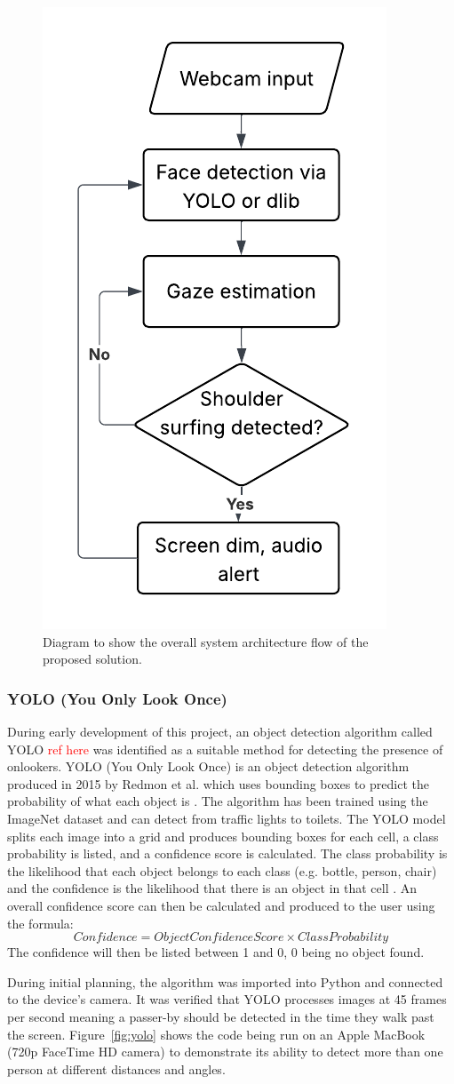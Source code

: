 \documentclass[12pt]{article}
\theoremstyle{plain}
\theoremstyle{definition}
\begin{document}
\begin{figure}[h!]
    \centering
    \includegraphics[width=0.3\linewidth]{img/architecture.png}
    \caption{Diagram to show the overall system architecture flow of the proposed solution.}
    \label{fig:architecture}
\end{figure}


\subsubsection{YOLO (You Only Look Once)}
\label{YOLO}

During early development of this project, an object detection algorithm called YOLO \textcolor{red}{ref here} was identified as a suitable method for detecting the presence of onlookers.
YOLO (You Only Look Once) is an object detection algorithm produced in 2015 by Redmon et al. which uses bounding boxes to predict the probability of what each object is \cite{redmon_you_2016}. The algorithm has been trained using the ImageNet dataset \cite{noauthor_imagenet_nodate} and can detect from traffic lights to toilets. The YOLO model splits each image into a grid and produces bounding boxes for each cell, a class probability is listed, and a confidence score is calculated. The class probability is the likelihood that each object belongs to each class (e.g. bottle, person, chair) and the confidence is the likelihood that there is an object in that cell \cite{redmon_you_2016}. An overall confidence score can then be calculated and produced to the user using the formula: 
\[
  Confidence = Object Confidence Score \times Class Probability
\]
The confidence will then be listed between 1 and 0, 0 being no object found.

During initial planning, the algorithm was imported into Python and connected to the device’s camera. It was verified that YOLO processes images at 45 frames per second \cite{redmon_you_2016} meaning a passer-by should be detected in the time they walk past the screen. Figure~\ref{fig:yolo} shows the code being run on an Apple MacBook (720p FaceTime HD camera) to demonstrate its ability to detect more than one person at different distances and angles.
\end{document}
